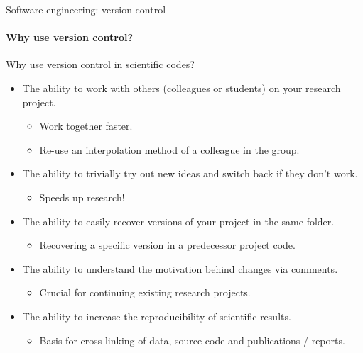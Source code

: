\begin{frame}{Software engineering: version control}
    \framesubtitle{Why use version control?}

    \vfill
    Why use version control in scientific codes?  
    \begin{itemize}
        \item The ability to work with others (colleagues or students) on your research project. 
            \begin{itemize}
                \item Work together faster.
                \item Re-use an interpolation method of a colleague in the group.
            \end{itemize}
        \item The ability to trivially try out new ideas and switch back if they don't work.
            \begin{itemize}
                \item Speeds up research!
            \end{itemize}
        \item The ability to easily recover versions of your project in the same folder. 
            \begin{itemize}
                \item Recovering a specific version in a predecessor project code.
            \end{itemize}
        \item The ability to understand the motivation behind changes via comments. 
            \begin{itemize}
                \item Crucial for continuing existing research projects.
            \end{itemize}
        \item The ability to increase the reproducibility of scientific results. 
            \begin{itemize}
                \item Basis for cross-linking of data, source code and publications / reports.  
            \end{itemize}
    \end{itemize}

\end{frame}

